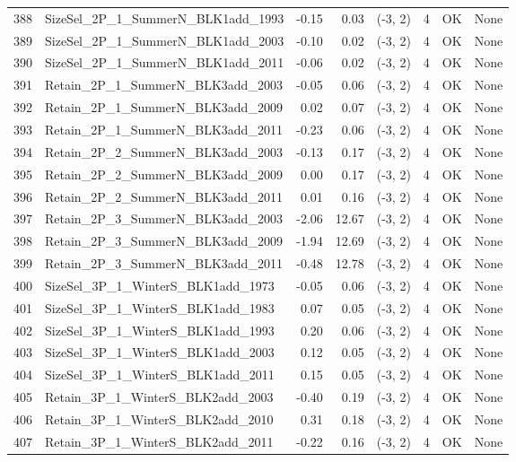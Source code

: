\documentclass[12pt,]{article}
\begin{document}
\begin{landscape}
\begin{longtable}{rlrrcrcl}
  388 & SizeSel\_2P\_1\_SummerN\_BLK1add\_1993 & -0.15 & 0.03 & (-3, 2) & 4 & OK & None \\ 
  389 & SizeSel\_2P\_1\_SummerN\_BLK1add\_2003 & -0.10 & 0.02 & (-3, 2) & 4 & OK & None \\ 
  390 & SizeSel\_2P\_1\_SummerN\_BLK1add\_2011 & -0.06 & 0.02 & (-3, 2) & 4 & OK & None \\ 
  391 & Retain\_2P\_1\_SummerN\_BLK3add\_2003 & -0.05 & 0.06 & (-3, 2) & 4 & OK & None \\ 
  392 & Retain\_2P\_1\_SummerN\_BLK3add\_2009 & 0.02 & 0.07 & (-3, 2) & 4 & OK & None \\ 
  393 & Retain\_2P\_1\_SummerN\_BLK3add\_2011 & -0.23 & 0.06 & (-3, 2) & 4 & OK & None \\ 
  394 & Retain\_2P\_2\_SummerN\_BLK3add\_2003 & -0.13 & 0.17 & (-3, 2) & 4 & OK & None \\ 
  395 & Retain\_2P\_2\_SummerN\_BLK3add\_2009 & 0.00 & 0.17 & (-3, 2) & 4 & OK & None \\ 
  396 & Retain\_2P\_2\_SummerN\_BLK3add\_2011 & 0.01 & 0.16 & (-3, 2) & 4 & OK & None \\ 
  397 & Retain\_2P\_3\_SummerN\_BLK3add\_2003 & -2.06 & 12.67 & (-3, 2) & 4 & OK & None \\ 
  398 & Retain\_2P\_3\_SummerN\_BLK3add\_2009 & -1.94 & 12.69 & (-3, 2) & 4 & OK & None \\ 
  399 & Retain\_2P\_3\_SummerN\_BLK3add\_2011 & -0.48 & 12.78 & (-3, 2) & 4 & OK & None \\ 
  400 & SizeSel\_3P\_1\_WinterS\_BLK1add\_1973 & -0.05 & 0.06 & (-3, 2) & 4 & OK & None \\ 
  401 & SizeSel\_3P\_1\_WinterS\_BLK1add\_1983 & 0.07 & 0.05 & (-3, 2) & 4 & OK & None \\ 
  402 & SizeSel\_3P\_1\_WinterS\_BLK1add\_1993 & 0.20 & 0.06 & (-3, 2) & 4 & OK & None \\ 
  403 & SizeSel\_3P\_1\_WinterS\_BLK1add\_2003 & 0.12 & 0.05 & (-3, 2) & 4 & OK & None \\ 
  404 & SizeSel\_3P\_1\_WinterS\_BLK1add\_2011 & 0.15 & 0.05 & (-3, 2) & 4 & OK & None \\ 
  405 & Retain\_3P\_1\_WinterS\_BLK2add\_2003 & -0.40 & 0.19 & (-3, 2) & 4 & OK & None \\ 
  406 & Retain\_3P\_1\_WinterS\_BLK2add\_2010 & 0.31 & 0.18 & (-3, 2) & 4 & OK & None \\ 
  407 & Retain\_3P\_1\_WinterS\_BLK2add\_2011 & -0.22 & 0.16 & (-3, 2) & 4 & OK & None \\ 

\end{longtable}
\end{landscape}
\end{document}
